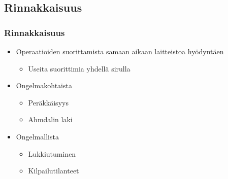 \documentclass{beamer}
\begin{document}
\subsection{Rinnakkaisuus}
\begin{frame}
    \frametitle{Rinnakkaisuus}
    \begin{itemize}
       \item Operaatioiden suorittamista samaan aikaan laitteistoa hyödyntäen
        \begin{itemize}
            \item Useita suorittimia yhdellä sirulla
        \end{itemize}
        \item Ongelmakohtaista
            \begin{itemize}
                \item Peräkkäisyys
                \item Ahmdalin laki
            \end{itemize}
        \item Ongelmallista
            \begin{itemize}
                \item Lukkiutuminen
                \item Kilpailutilanteet
            \end{itemize}
    \end{itemize}
\end{frame}
\end{document}
